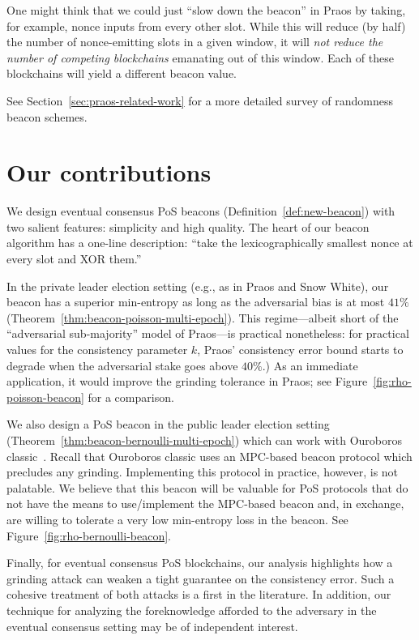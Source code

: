     One might think that we could just ``slow down the beacon'' in Praos 
    by taking, for example, nonce inputs from every other slot. 
    While this will reduce (by half) the number of nonce-emitting slots in a given window, 
    it will \emph{not reduce the number of competing blockchains} emanating out of this window. 
    Each of these blockchains will yield a different beacon value. 


    See Section~\ref{sec:praos-related-work} for 
    a more detailed survey of randomness beacon schemes.



\section{Our contributions}
    We design eventual consensus PoS beacons 
    (Definition~\ref{def:new-beacon}) 
    with two salient features: simplicity and high quality. 
    The heart of our beacon algorithm has a one-line description: 
    ``take the lexicographically smallest nonce at every slot and XOR them.'' 


    In the private leader election setting (e.g., as in Praos and Snow White), 
    our beacon has a superior min-entropy 
    as long as the adversarial bias is at most $41\%$ (Theorem~\ref{thm:beacon-poisson-multi-epoch}). 
    This regime---albeit short of the ``adversarial sub-majority'' model of Praos---is practical nonetheless: 
    for practical values for the consistency parameter $k$, 
    Praos' consistency error bound 
    starts to degrade when the adversarial stake goes above $40\%$.) 
    As an immediate application, it would improve the grinding tolerance in Praos; 
    see Figure~\ref{fig:rho-poisson-beacon} for a comparison.


    We also design a PoS beacon in the public leader election setting (Theorem~\ref{thm:beacon-bernoulli-multi-epoch})
    which can work with Ouroboros classic~\cite{Ouroboros}. 
    Recall that Ouroboros classic uses an MPC-based beacon protocol 
    which precludes any grinding. 
    Implementing this protocol in practice, however, is not palatable. 
    We believe that this beacon will be valuable for 
    PoS protocols 
    that do not have the means to use/implement the MPC-based beacon 
    and, in exchange, are willing to tolerate a very low min-entropy loss 
    in the beacon. 
    See Figure~\ref{fig:rho-bernoulli-beacon}.


    Finally, for eventual consensus PoS blockchains, 
    our analysis highlights 
    how a grinding attack can weaken a tight guarantee on the consistency error. 
    Such a cohesive treatment of both attacks is a first in the literature.
    In addition, our technique for analyzing 
    the foreknowledge afforded to the adversary in the eventual consensus setting 
    may be of independent interest.




